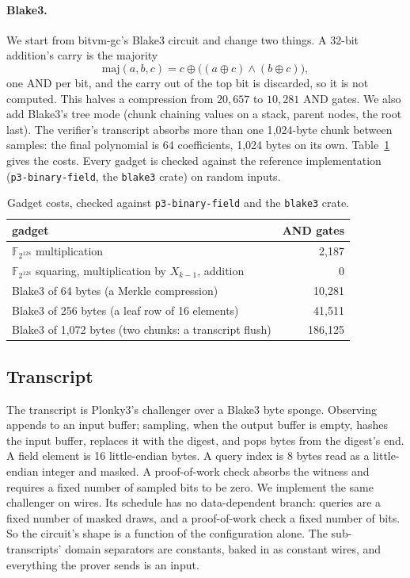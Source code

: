 \documentclass[11pt]{article}
\newcommand{\F}{\mathbb{F}_{2^{128}}}
\newcommand{\AND}{\textsf{AND}}
\begin{document}
\paragraph{Blake3.} We start from bitvm-gc's Blake3 circuit and change two
things. A 32-bit addition's carry is the majority
\[
  \mathrm{maj}(a,b,c)=c\oplus\big((a\oplus c)\wedge(b\oplus c)\big),
\]
one \AND{} per bit, and the carry out of the top bit is discarded, so it is not
computed. This halves a compression from $20{,}657$ to $10{,}281$ \AND{} gates.
We also add Blake3's tree mode (chunk chaining values on a stack, parent nodes,
the root last). The verifier's transcript absorbs more than one 1{,}024-byte
chunk between samples: the final polynomial is 64 coefficients, 1{,}024 bytes
on its own. Table~\ref{tab:gadgets} gives the costs. Every gadget is checked
against the reference implementation (\texttt{p3-binary-field}, the
\texttt{blake3} crate) on random inputs.

\begin{table}[t]\centering\small
\begin{tabular}{lr}\toprule
gadget & \AND{} gates\\\midrule
$\F$ multiplication & 2{,}187\\
$\F$ squaring, multiplication by $X_{k-1}$, addition & 0\\
Blake3 of 64 bytes (a Merkle compression) & 10{,}281\\
Blake3 of 256 bytes (a leaf row of 16 elements) & 41{,}511\\
Blake3 of 1{,}072 bytes (two chunks: a transcript flush) & 186{,}125\\\bottomrule
\end{tabular}
\caption{Gadget costs, checked against \texttt{p3-binary-field} and the
\texttt{blake3} crate.}
\label{tab:gadgets}
\end{table}

\subsection{Transcript}

The transcript is Plonky3's challenger over a Blake3 byte sponge. Observing
appends to an input buffer; sampling, when the output buffer is empty, hashes
the input buffer, replaces it with the digest, and pops bytes from the digest's
end. A field element is 16 little-endian bytes. A query index is 8 bytes read
as a little-endian integer and masked. A proof-of-work check absorbs the
witness and requires a fixed number of sampled bits to be zero. We implement the
same challenger on wires. Its schedule has no data-dependent branch: queries are
a fixed number of masked draws, and a proof-of-work check a fixed number of
bits. So the circuit's shape is a function of the configuration alone. The
sub-transcripts' domain separators are constants, baked in as constant wires,
and everything the prover sends is an input.
\end{document}
